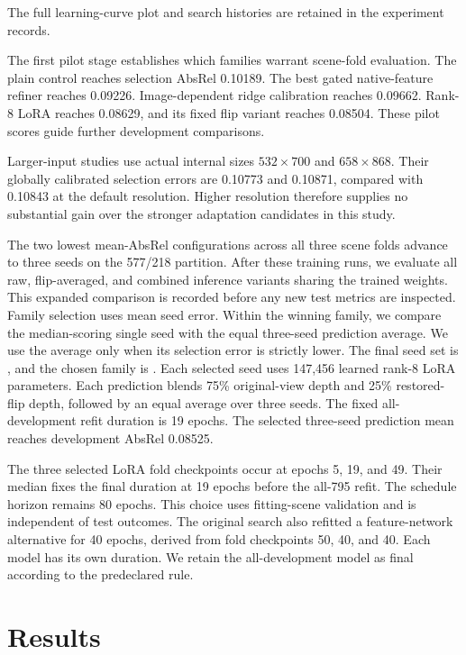 \documentclass[10pt,twocolumn,letterpaper]{article}
\begin{document}
The full learning-curve plot and search histories are retained in the experiment records.


The first pilot stage establishes which families warrant scene-fold evaluation. The plain control reaches selection AbsRel 0.10189. The best gated native-feature refiner reaches 0.09226. Image-dependent ridge calibration reaches 0.09662. Rank-8 LoRA reaches 0.08629, and its fixed flip variant reaches 0.08504. These pilot scores guide further development comparisons.

Larger-input studies use actual internal sizes $532\times700$ and $658\times868$. Their globally calibrated selection errors are 0.10773 and 0.10871, compared with 0.10843 at the default resolution. Higher resolution therefore supplies no substantial gain over the stronger adaptation candidates in this study.



The two lowest mean-AbsRel configurations across all three scene folds advance to three seeds on the 577/218 partition. After these training runs, we evaluate all raw, flip-averaged, and combined inference variants sharing the trained weights. This expanded comparison is recorded before any new test metrics are inspected. Family selection uses mean seed error. Within the winning family, we compare the median-scoring single seed with the equal three-seed prediction average. We use the average only when its selection error is strictly lower. The final seed set is \ResearchSeeds{}, and the chosen family is \ResearchMethod{}. Each selected seed uses 147,456 learned rank-8 LoRA parameters. Each prediction blends 75\% original-view depth and 25\% restored-flip depth, followed by an equal average over three seeds. The fixed all-development refit duration is 19 epochs. The selected three-seed prediction mean reaches development AbsRel 0.08525.

The three selected LoRA fold checkpoints occur at epochs 5, 19, and 49. Their median fixes the final duration at 19 epochs before the all-795 refit. The schedule horizon remains 80 epochs. This choice uses fitting-scene validation and is independent of test outcomes. The original search also refitted a feature-network alternative for 40 epochs, derived from fold checkpoints 50, 40, and 40. Each model has its own duration. We retain the all-development model as final according to the predeclared rule.

\section{Results}
\end{document}

